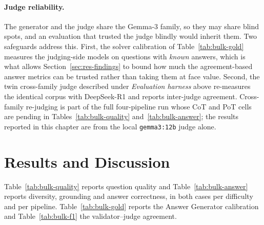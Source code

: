 \paragraph{Judge reliability.} The generator and the judge share the Gemma-3
family, so they may share blind spots, and an evaluation that trusted the judge
blindly would inherit them. Two safeguards address this. First, the solver
calibration of Table~\ref{tab:bulk-gold} measures the judging-side models on
questions with \emph{known} answers, which is what allows
Section~\ref{sec:res-findings} to bound how much the agreement-based answer
metrics can be trusted rather than taking them at face value. Second, the twin
cross-family judge described under \emph{Evaluation harness} above re-measures
the identical corpus with DeepSeek-R1 and reports inter-judge agreement.
Cross-family re-judging is part of the full four-pipeline run whose CoT and PoT
cells are pending in Tables~\ref{tab:bulk-quality} and~\ref{tab:bulk-answer};
the results reported in this chapter are from the local \texttt{gemma3:12b}
judge alone.

\section{Results and Discussion}
\label{sec:res-results}

Table~\ref{tab:bulk-quality} reports question quality and
Table~\ref{tab:bulk-answer} reports diversity, grounding and answer correctness, in
both cases per difficulty and per pipeline. Table~\ref{tab:bulk-gold} reports the
Answer Generator calibration and Table~\ref{tab:bulk-f1} the validator--judge
agreement.

